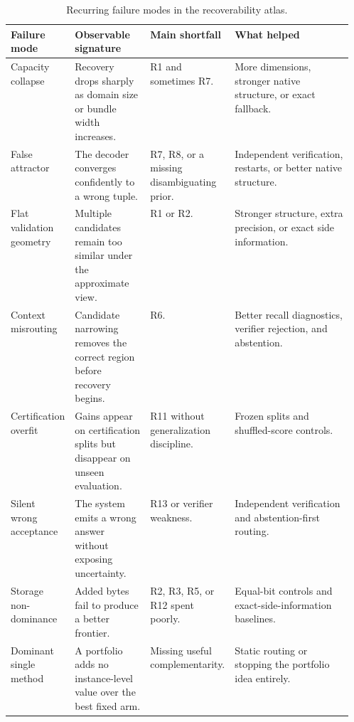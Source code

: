 \begin{table}[htbp]
\centering
\scriptsize
\begin{threeparttable}
\caption{Recurring failure modes in the recoverability atlas.}
\label{tab:failure-modes}
\begin{tabularx}{\linewidth}{@{}p{0.18\linewidth}p{0.22\linewidth}p{0.16\linewidth}X@{}}
\toprule
\textbf{Failure mode} & \textbf{Observable signature} & \textbf{Main shortfall} & \textbf{What helped} \\
\midrule
Capacity collapse & Recovery drops sharply as domain size or bundle width increases. & R1 and sometimes R7. & More dimensions, stronger native structure, or exact fallback. \\
False attractor & The decoder converges confidently to a wrong tuple. & R7, R8, or a missing disambiguating prior. & Independent verification, restarts, or better native structure. \\
Flat validation geometry & Multiple candidates remain too similar under the approximate view. & R1 or R2. & Stronger structure, extra precision, or exact side information. \\
Context misrouting & Candidate narrowing removes the correct region before recovery begins. & R6. & Better recall diagnostics, verifier rejection, and abstention. \\
Certification overfit & Gains appear on certification splits but disappear on unseen evaluation. & R11 without generalization discipline. & Frozen splits and shuffled-score controls. \\
Silent wrong acceptance & The system emits a wrong answer without exposing uncertainty. & R13 or verifier weakness. & Independent verification and abstention-first routing. \\
Storage non-dominance & Added bytes fail to produce a better frontier. & R2, R3, R5, or R12 spent poorly. & Equal-bit controls and exact-side-information baselines. \\
Dominant single method & A portfolio adds no instance-level value over the best fixed arm. & Missing useful complementarity. & Static routing or stopping the portfolio idea entirely. \\
\bottomrule
\end{tabularx}
\end{threeparttable}
\end{table}

